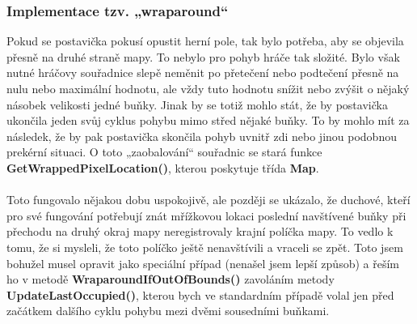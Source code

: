 \documentclass[a4]{article}
\begin{document}
\subsubsection{Implementace tzv. „wraparound“}
Pokud se postavička pokusí opustit herní pole, tak bylo potřeba, aby se objevila přesně na druhé straně mapy. To nebylo pro pohyb hráče tak složité. Bylo však nutné hráčovy souřadnice slepě neměnit po přetečení nebo podtečení přesně na nulu nebo maximální hodnotu, ale vždy tuto hodnotu snížit nebo zvýšit o nějaký násobek velikosti jedné buňky. Jinak by se totiž mohlo stát, že by postavička ukončila jeden svůj cyklus pohybu mimo střed nějaké buňky. To by mohlo mít za následek, že by pak postavička skončila pohyb uvnitř zdi nebo jinou podobnou prekérní situaci. O toto „zaobalování“ souřadnic se stará funkce \textbf{GetWrappedPixelLocation()}, kterou poskytuje třída \textbf{Map}.
\\\\
Toto fungovalo nějakou dobu uspokojivě, ale později se ukázalo, že duchové, kteří pro své fungování potřebují znát mřížkovou lokaci poslední navštívené buňky při přechodu na druhý okraj mapy neregistrovaly krajní políčka mapy. To vedlo k tomu, že si mysleli, že toto políčko ještě nenavštívili a vraceli se zpět. Toto jsem bohužel musel opravit jako speciální případ (nenašel jsem lepší způsob) a řeším ho v metodě \textbf{WraparoundIfOutOfBounds()} zavoláním metody \textbf{UpdateLastOccupied()}, kterou bych ve standardním případě volal jen před začátkem dalšího cyklu pohybu mezi dvěmi sousedními buňkami.
\\\\
\end{document}
